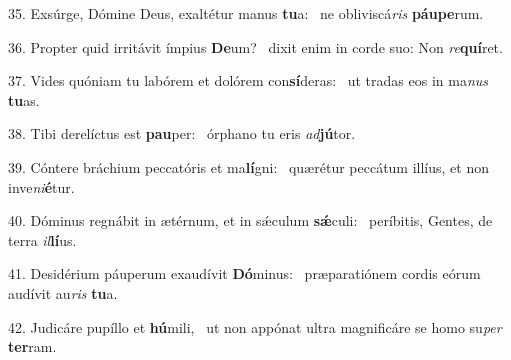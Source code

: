 35. Exsúrge, Dómine Deus, exaltétur manus \textbf{tu}a: \ast\  ne obliviscá\textit{ris} \textbf{páu}\textbf{pe}rum.\

36. Propter quid irritávit ímpius \textbf{De}um? \ast\  dixit enim in corde suo: Non \textit{re}\textbf{quí}ret.\

37. Vides quóniam tu labórem et dolórem con\textbf{sí}deras: \ast\  ut tradas eos in ma\textit{nus} \textbf{tu}as.\

38. Tibi derelíctus est \textbf{pau}per: \ast\  órphano tu eris \textit{ad}\textbf{jú}tor.\

39. Cóntere bráchium peccatóris et ma\textbf{lí}gni: \ast\  quærétur peccátum illíus, et non inve\textit{ni}\textbf{é}tur.\

40. Dóminus regnábit in ætérnum, et in sǽculum \textbf{sǽ}culi: \ast\  períbitis, Gentes, de terra \textit{il}\textbf{lí}us.\

41. Desidérium páuperum exaudívit \textbf{Dó}minus: \ast\  præparatiónem cordis eórum audívit au\textit{ris} \textbf{tu}a.\

42. Judicáre pupíllo et \textbf{hú}mili, \ast\  ut non appónat ultra magnificáre se homo su\textit{per} \textbf{ter}ram.\

